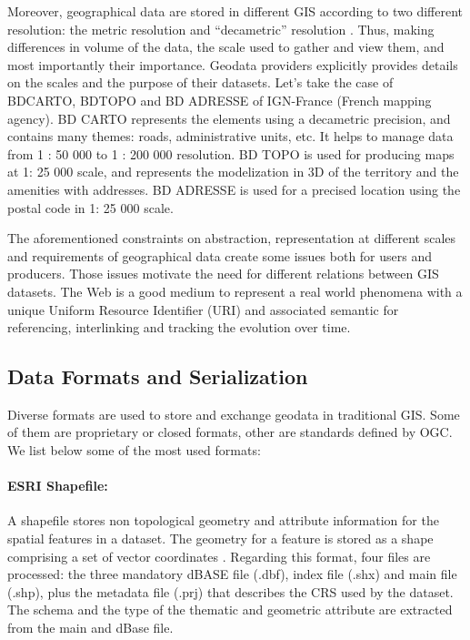 Moreover, geographical data are stored in different GIS according to two different resolution: the metric resolution and ``decametric'' resolution \cite{anamaria08}. Thus, making differences in volume of the data, the scale used to gather and view them, and most importantly their importance. Geodata providers explicitly provides details on the scales and the purpose of their datasets. Let's take the case of BDCARTO\circledR \hspace{1pt}, BDTOPO\circledR \hspace{1pt} and BD ADRESSE\circledR \hspace{1pt} of IGN-France (French mapping agency). BD CARTO\circledR \hspace{1pt} represents the elements using a decametric precision, and contains many themes: roads, administrative units, etc. It helps to manage data from 1 : 50 000 to 1 : 200 000 resolution.  BD TOPO is used for producing maps at 1: 25 000 scale, and represents the modelization in 3D of the territory and the amenities with addresses. BD ADRESSE is used for a precised location using the postal code in 1: 25 000 scale. 

The aforementioned constraints on abstraction, representation at different scales and requirements of geographical data create some issues both for users and producers. Those issues motivate the need for different relations between GIS datasets. The Web is a good medium to represent a real world phenomena with a unique Uniform Resource Identifier (URI) and associated semantic for referencing, interlinking and tracking the evolution over time. 
 

\subsection{Data Formats and Serialization}
Diverse formats are used to store and exchange geodata in traditional GIS. Some of them are proprietary or closed formats, other are standards defined by OGC. We list below some of the most used formats:
 
 \paragraph{ESRI Shapefile:}
 
 A shapefile stores non topological geometry and attribute information for the spatial
features in a dataset. The geometry for a feature is stored as a shape comprising a set of
vector coordinates \cite{esri98}. Regarding this format, four files are processed: the three mandatory dBASE file (.dbf), index file (.shx) and main file (.shp), plus the metadata file (.prj) that describes the CRS used by the dataset. The schema and the type of the thematic and geometric attribute are extracted from the main and dBase file.

